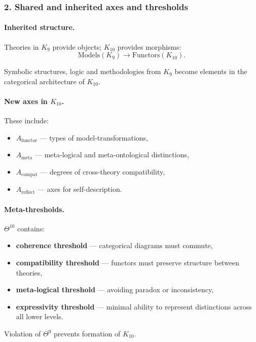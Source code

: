 \subsubsection{2. Shared and inherited axes and thresholds}

\paragraph{Inherited structure.}
Theories in $K_9$ provide objects; $K_{10}$ provides morphisms:
\[
\text{Models}(K_9) \rightarrow \text{Functors}(K_{10}).
\]

Symbolic structures, logic and methodologies from $K_9$ become elements in
the categorical architecture of $K_{10}$.

\paragraph{New axes in $K_{10}$.}
These include:
\begin{itemize}
  \item $A_{\mathrm{functor}}$ — types of model-transformations,
  \item $A_{\mathrm{meta}}$ — meta-logical and meta-ontological distinctions,
  \item $A_{\mathrm{compat}}$ — degrees of cross-theory compatibility,
  \item $A_{\mathrm{reflect}}$ — axes for self-description.
\end{itemize}

\paragraph{Meta-thresholds.}
$\Theta^{10}$ contains:
\begin{itemize}
  \item \textbf{coherence threshold} — categorical diagrams must commute,
  \item \textbf{compatibility threshold} — functors must preserve structure
        between theories,
  \item \textbf{meta-logical threshold} — avoiding paradox or inconsistency,
  \item \textbf{expressivity threshold} — minimal ability to represent
        distinctions across all lower levels.
\end{itemize}

Violation of $\Theta^9$ prevents formation of $K_{10}$.

